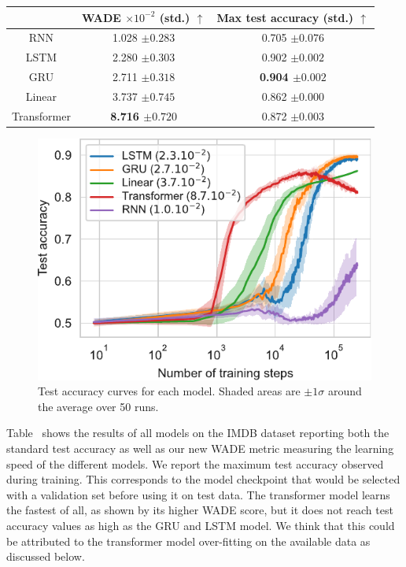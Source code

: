   \begin{tabular}{c|cc}
\toprule
& \bfseries WADE $\times 10^{-2}$ (std.) $\uparrow$ & \bfseries Max test accuracy (std.) $\uparrow$ \\
\midrule
    RNN & 1.028 ${\scriptstyle \pm0.283}$ & 0.705 ${\scriptstyle \pm0.076 }$ \\
LSTM & 2.280 ${\scriptstyle \pm0.303}$ & 0.902 ${\scriptstyle \pm0.002 }$ \\
GRU & 2.711 ${\scriptstyle \pm0.318}$ & \bfseries 0.904 ${\scriptstyle \pm0.002 }$ \\
Linear & 3.737 ${\scriptstyle \pm0.745}$ & 0.862 ${\scriptstyle \pm0.000 }$ \\
Transformer & \bfseries 8.716 ${\scriptstyle \pm0.720}$ & 0.872 ${\scriptstyle \pm0.003 }$ \\

    \bottomrule
  \end{tabular}

  \begin{figure}

  \centering
  \includegraphics[width=.4\linewidth]{figures/wade_supervised_fixed.pdf}
  \caption{Test accuracy curves for each model. Shaded areas are
    $\pm 1\sigma$ around the average over 50 runs.\label{fig:wade-sup}}%
  \end{figure}

Table~ shows the results of all models on the IMDB dataset
reporting both the standard test accuracy as well as our new WADE metric
measuring the learning speed of the different models. We report the maximum test
accuracy observed during training. This corresponds to the model checkpoint that
would be selected with a validation set before using it on test data. The
transformer model learns the fastest of all, as shown by its higher WADE score,
but it does not reach test accuracy values as high as the GRU and LSTM model. We
think that this could be attributed to the transformer model over-fitting on the
available data as discussed below.

